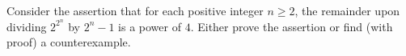 Consider the assertion that for each positive integer $n\geq2$,  the remainder upon dividing $2^{2^n}$ by $2^n-1$ is a power of $4$.  Either prove the assertion or find (with proof) a counterexample.